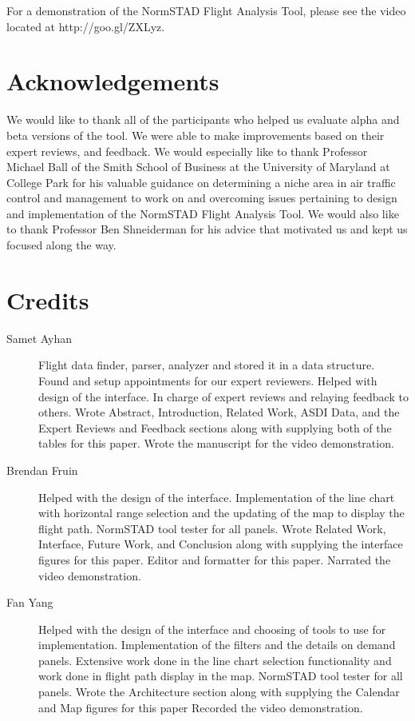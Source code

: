 \documentclass{sig-alternate}
\begin{document}
For a demonstration of the NormSTAD Flight Analysis Tool, please see the video
located at http://goo.gl/ZXLyz.

\section{Acknowledgements}
\label{sec-acknowledgements}
We would like to thank all of the
participants who helped us evaluate alpha and
beta versions of the tool. We were able to make
improvements based on their expert reviews,
and feedback. We would especially like to thank
Professor Michael Ball of the Smith School of Business 
at the University of Maryland at College Park for his valuable guidance
on determining a niche area in air traffic control
and management to work on and overcoming issues
pertaining to design and implementation of the NormSTAD Flight
Analysis Tool. We would also like to thank
Professor Ben Shneiderman for his advice that
motivated us and kept us focused along the way.

\section{Credits}

\begin{description}
\item[Samet Ayhan]
Flight data finder, parser, analyzer and stored it in a data structure. Found 
and setup appointments for our expert reviewers. Helped with
design of the interface. In charge of expert reviews
and relaying feedback to others. Wrote Abstract, Introduction, Related Work, ASDI
Data, and the Expert Reviews and Feedback sections along with 
supplying both of the tables for this paper. Wrote the manuscript for the 
video demonstration.

\item[Brendan Fruin]
Helped with the design of the interface.
Implementation of the line chart with horizontal range selection and the 
updating of the map to display the flight path. NormSTAD tool tester for all
panels. Wrote Related Work, Interface, Future Work,
and Conclusion along with supplying the interface figures for this paper. 
Editor and formatter for this paper. Narrated the video demonstration.

\item[Fan Yang]
Helped with the design of the interface and choosing of tools to use for implementation.
Implementation of the filters and the details on demand panels. Extensive
work done in the line chart selection functionality and work done in flight path
display in the map.
NormSTAD tool tester for all panels. Wrote the Architecture section
along with supplying the Calendar and Map figures for this paper
Recorded the video demonstration.

\end{description}
\end{document}
